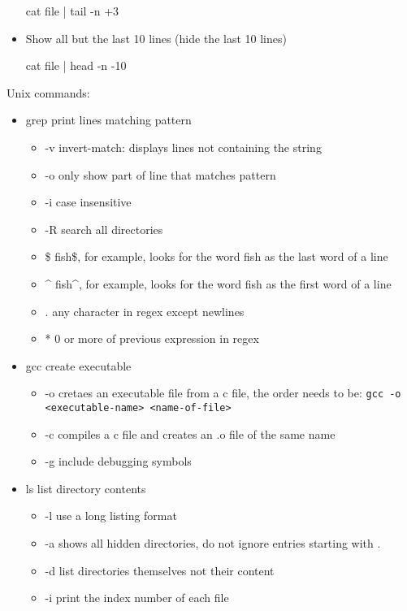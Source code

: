 \documentclass[10pt, a4paper]{article}
\begin{document}
\begin{multicols}{4}
\begin{itemize}
    cat file | tail -n +3

    \item Show all but the last 10 lines
    (hide the last 10 lines)

    cat file | head -n -10      
    \end{itemize}
      
    Unix commands:

    \begin{itemize}
        \item grep  print lines matching pattern
        \begin{itemize}
        \item  -v  invert-match: displays lines not containing the string 
        \item  -o  only show part of line that matches pattern 
        \item  -i  case insensitive 
        \item  -R  search all directories 
        \item  \$  fish\$, for example, looks for the word fish as the last word of a line 
        \item  \^{}  fish\^{}, for example, looks for the word fish as the first word of a line 
        \item  .  any character in regex except newlines 
        \item  *  0 or more of previous expression in regex 
        \end{itemize}
        \item gcc  create executable
        \begin{itemize}
        \item  -o  cretaes an executable file from a c file, the order needs to be: \texttt{gcc -o <executable-name> <name-of-file>} 
        \item  -c  compiles a c file and creates an .o file of the same name 
        \item  -g  include debugging symbols \end{itemize} 
        \item ls  list directory contents
        \begin{itemize}
        \item  -l  use a long listing format 
        \item  -a  shows all hidden directories, do not ignore entries starting with . 
        \item  -d  list directories themselves not their content 
        \item  -i  print the index number of each file 

\end{itemize}
\end{itemize}
\end{multicols}
\end{document}
